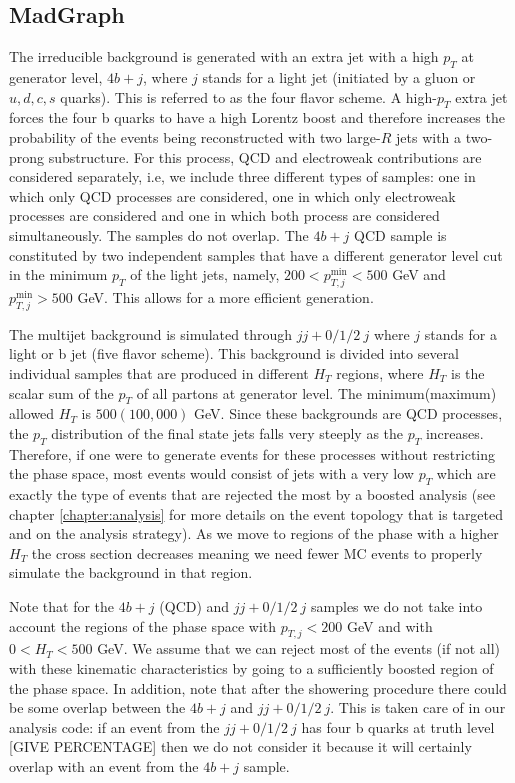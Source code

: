 \subsection{MadGraph}

The irreducible background is generated with an extra jet with a high $p_T$ at generator level, $4b+j$, where $j$ stands for a light jet (initiated by a gluon or $u,d,c,s$ quarks). This is referred to as the four flavor scheme. A high-$p_T$ extra jet forces the four b quarks to have a high Lorentz boost and therefore increases the probability of the events being reconstructed with two large-$R$ jets with a two-prong substructure. For this process, QCD and electroweak contributions are considered separately, i.e, we include three different types of samples: one in which only QCD processes are considered, one in which only electroweak processes are considered and one in which both process are considered simultaneously. The samples do not overlap. The $4b+j$ QCD sample is constituted by two independent samples that have a different generator level cut in the minimum $p_T$ of the light jets, namely, $200<p_{T,j}^{\min}<500$ GeV and $p_{T,j}^{\min}>500$ GeV. This allows for a more efficient generation. 

The multijet background is simulated through $jj+0/1/2 ~j$ where $j$ stands for a light or b jet (five flavor scheme).
This background is divided into several individual samples that are produced in different $H_T$ regions, where $H_T$ is the scalar sum of the $p_T$ of all partons at generator level. The minimum(maximum) allowed $H_T$ is $500(100,000)$ GeV. Since these backgrounds are QCD processes, the $p_T$ distribution of the final state jets falls very steeply as the $p_T$ increases. Therefore, if one were to generate events for these processes without restricting the phase space, most events would consist of jets with a very low $p_T$ which are exactly the type of events that are rejected the most by a boosted analysis (see chapter \ref{chapter:analysis} for more details on the event topology that is targeted and on the analysis strategy). As we move to regions of the phase with a higher $H_T$ the cross section decreases meaning we need fewer MC events to properly simulate the background in that region.

Note that for the $4b+j$ (QCD) and $jj+0/1/2 ~j$ samples we do not take into account the regions of the phase space with $p_{T,j}<200$ GeV and with $0<H_T<500$ GeV. We assume that we can reject most of the events (if not all) with these kinematic characteristics by going to a sufficiently boosted region of the phase space. In addition, note that after the showering procedure there could be some overlap between the $4b+j$ and $jj+0/1/2~ j$. This is taken care of in our analysis code: if an event from the $jj+0/1/2 ~j$ has four b quarks at truth level [GIVE PERCENTAGE] then we do not consider it because it will certainly overlap with an event from the $4b+j$ sample.

